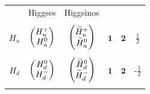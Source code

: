 \begin{table}
\begin{tabular}{cccccc}
                   & Higgses                                         & Higgsinos                                                                      &                    &              & \\ \cmidrule{2-3}\\
    $H_u$          & $\begin{pmatrix} H_u^+ \\ H_u^0\end{pmatrix}$                       & $\begin{pmatrix} \widetilde{H}_u^+ \\ \widetilde{H}_u^0\end{pmatrix}$                              & $\mathbf{1}$       & $\mathbf{2}$ & $\frac{1}{2}$\\\\
    $H_d$          & $\begin{pmatrix} H_d^0 \\ H_d^-\end{pmatrix}$                       & $\begin{pmatrix} \widetilde{H}_d^0 \\ \widetilde{H}_d^-\end{pmatrix}$                              & $\mathbf{1}$       & $\mathbf{2}$ & -$\frac{1}{2}$\\\\
    \bottomrule
  \end{tabular}
\end{table}

